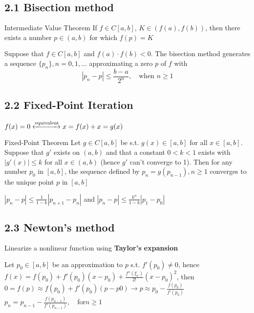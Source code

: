 \documentclass[11pt]{article}
\begin{document}
\subsection{2.1 Bisection method}
\label{sec:org5174ad8}
\begin{theorem}{Intermediate Value Theorem}
If $f\in C[a,b]$, $K\in(f(a), f(b))$, then there exists a number $p\in(a,b)$
for which $f(p)=K$
\end{theorem}

\begin{theorem}
Suppose that $f\in C[a,b]$ and $f(a)\cdot f(b)<0$. The bisection method
generates a sequence $\{p_n\},n=0,1,\dots$ approximating a zero $p$ of $f$ with
\begin{equation*}
|p_n-p|\le\frac{b-a}{2^n}, \quad\text{when } n\ge 1
\end{equation*}
\end{theorem}
\subsection{2.2 Fixed-Point Iteration}
\label{sec:org3fcf22d}
\(f(x)=0\xleftrightarrow{\text{equivalent}} x=f(x)+x=g(x)\)

\begin{theorem}{Fixed-Point Theorem}
Let $g\in C[a,b]$ be s.t. $g(x)\in[a,b]$ for all $x\in[a,b]$. Suppose that
$g'$ exists on $(a,b)$ and that a constant $0<k<1$ exists with $|g'(x)|\le k$
for all $x\in(a,b)$ (hence $g'$ can't converge to 1). Then for any number
$p_0$ in $[a,b]$, the sequence defined by $p_n=g(p_{n-1}), n\ge 1$ converges
to the unique point $p$ in $[a,b]$
\end{theorem}

\begin{corollary}
$|p_n-p|\le\frac{1}{1-k}|p_{n+1}-p_n|$ and
$|p_n-p|\le\frac{k^n}{1-k}|p_1-p_0|$
\end{corollary}
\subsection{2.3 Newton's method}
\label{sec:orgf97ea1d}
Linearize a nonlinear function using \textbf{Taylor's expansion}

Let \(p_0\in [a,b]\) be an approximation to \(p\) s.t. \(f'(p_0)\neq 0\), hence 
\(f(x)=f(p_0)+f'(p_0)(x-p_0)+\frac{f''(\xi_x)}{2!}(x-p_0)^2\), then
\(0=f(p)\approx f(p_0)+f'(p_0)(p-p0)\rightarrow p\approx
   p_0-\frac{f(p_0)}{f'(p_0)}\)
\(p_n=p_{n-1}-\frac{f(p_{n-1})}{f'(p_{n-1})},\quad\text{for} n\ge 1\)
\end{document}
